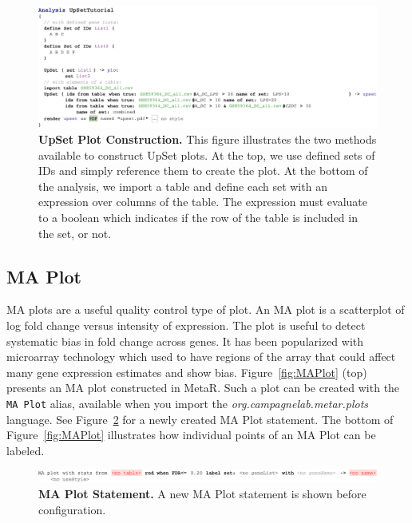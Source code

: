 \begin{figure}[h!tbp]
  \centering
  \includegraphics[width=\figWidthWide]{figures/UpSetIllustration-1.pdf}
\caption[UpSet Plot Construction.]{\textbf{UpSet Plot Construction.} This figure illustrates the two methods available to construct UpSet plots. At the top, we use defined sets of IDs and simply reference them to create the plot. At the bottom of the analysis, we import a table and define each set with an expression over columns of the table. The expression must evaluate to a boolean which indicates if the row of the table is included in the set, or not.}
\label{fig:AnalysisWithUpset}
\end{figure}

\subsection{MA Plot}
MA plots are a useful quality control type of plot. An MA plot is a scatterplot of log fold change versus intensity of expression. The plot is useful to detect systematic bias in fold change across genes. It has been popularized with microarray technology which used to have regions of the array that could affect many gene expression estimates and show bias. Figure~\ref{fig:MAPlot} (top) presents an MA plot constructed in MetaR. Such a plot can be created with the \texttt{MA Plot} alias, available when you import the \textit{org.campagnelab.metar.plots} language. See Figure~\ref{fig:NewMAPlot} for a newly created MA Plot statement. The bottom of Figure~\ref{fig:MAPlot} illustrates how individual points of an MA Plot can be labeled.


\begin{figure}[h!tbp]
  \centering
  \includegraphics[width=\figWidthWide]{figures/NewMAPlot-1.pdf}
\caption[MA Plot Statement.]{\textbf{MA Plot Statement.} A new MA Plot statement is shown before configuration.}
\label{fig:NewMAPlot}
\end{figure}
 
